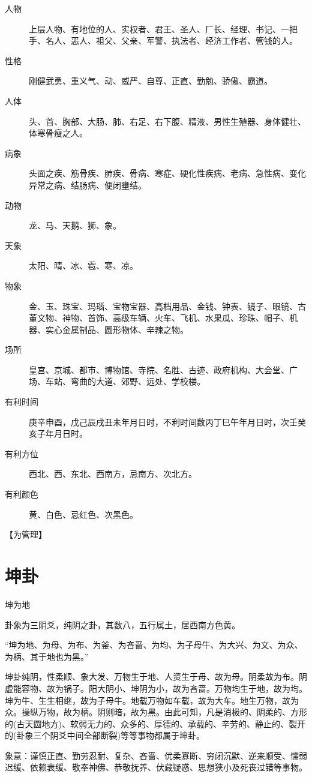 \documentclass[12pt,oneside]{book}
\begin{document}
\begin{description}
\item[人物] 上层人物、有地位的人、实权者、君王、圣人、厂长、经理、书记、一把手、名人、恶人、祖父、父亲、军警、执法者、经济工作者、管钱的人。
\item[性格] 刚健武勇、重义气、动、威严、自尊、正直、勤勉、骄傲、霸道。
\item[人体] 头、首、胸部、大肠、肺、右足、右下腹、精液、男性生殖器、身体健壮、体寒骨瘦之人。
\item[病象] 头面之疾、筋骨疾、肺疾、骨病、寒症、硬化性疾病、老病、急性病、变化异常之病、结肠病、便闭壅结。
\item[动物] 龙、马、天鹅、狮、象。
\item[天象] 太阳、晴、冰、雹、寒、凉。
\item[物象] 金、玉、珠宝、玛瑙、宝物宝器、高档用品、金钱、钟表、镜子、眼镜、古董文物、神物、首饰、高级车辆、火车、飞机、水果瓜、珍珠、帽子、机器、实心金属制品、圆形物体、辛辣之物。
\item[场所] 皇宫、京城、都市、博物馆、寺院、名胜、古迹、政府机构、大会堂、广场、车站、弯曲的大道、郊野、远处、学校楼。
\item[有利时间] 庚辛申酉，戊己辰戌丑未年月日时，不利时间数丙丁巳午年月日时，次壬癸亥子年月日时。
\item[有利方位] 西北、西、东北、西南方，忌南方、次北方。
\item[有利颜色] 黄、白色、忌红色、次黑色。
\end{description}

【为管理】

\section{坤卦}
坤为地

卦象为三阴爻，纯阴之卦，其数八，五行属土，居西南方色黄。

“坤为地、为母、为布、为釜、为吝啬、为均、为子母牛、为大兴、为文、为众、为柄、其于地也为黑。”

坤卦纯阴，性柔顺、象大发、万物生于地、人资生于母、故为母。阴柔故为布。阴虚能容物、故为锅子。阳大阴小、坤阴为小，故为吝啬。万物均生于地，故为均。坤为牛、生生相继，故为子母牛。地载万物如车载，故为大车。地生万物，故为众。操纵万物，故为柄。阴则暗，故为黑。由此可知，凡是消极的、阴柔的、方形的(古天圆地方)、软弱无力的、众多的、厚德的、承载的、辛劳的、静止的、裂开的(卦象三个阴爻中间全部断裂)等等事物都属于坤卦。

象意：谨慎正直、勤劳忍耐、复杂、吝啬、优柔寡断、穷闭沉默、逆来顺受、懦弱迟缓、依赖衰缓、敬奉神佛、恭敬抚养、伏藏疑惑、思想狭小及死丧过错等事物。
\end{document}
